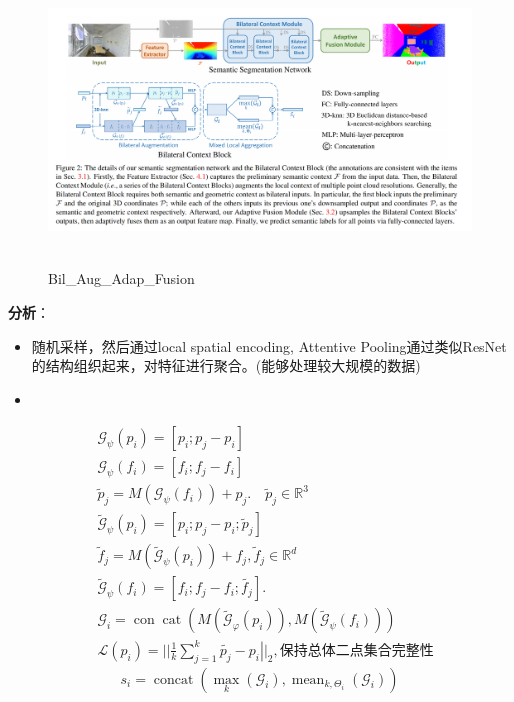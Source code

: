 \documentclass[a4paper,12pt]{article}
\begin{document}
	\begin{figure}[H]
	\begin{center}
		\includegraphics[width=1\textwidth]{img/Bil_Aug_Adap_Fusion.png} 
		\caption{Bil\_Aug\_Adap\_Fusion}
	\end{center}
\end{figure}


\textbf{分析}：
\begin{itemize}
	\item 随机采样，然后通过local spatial encoding, Attentive Pooling通过类似ResNet的结构组织起来，对特征进行聚合。(能够处理较大规模的数据)
	\item 
\end{itemize}
$$
\begin{aligned}
	&\mathcal{G}_{\psi}\left(p_{i}\right)=\left[p_{i} ; p_{j}-p_{i}\right]\\
	&\mathcal{G}_\psi\left(f_{i}\right)=\left[f_{i} ; f_{j}-f_{i}\right]\\
	&\tilde{p}_{j}=M\left(\mathcal{G}_\psi\left(f_{i}\right)\right)+p_{j} . \quad \tilde{p}_{j} \in \mathbb{R}^{3}\\
	&\tilde{\mathcal{G}}_{\psi}\left(p_{i}\right)=\left[p_{i} ; p_{j}-p_{i} ; \tilde{p}_{j}\right]\\
	&\tilde{f}_{j}=M\left(\tilde{\mathcal{G}}_{\psi}\left(p_{i}\right)\right)+f_{j}, \tilde{f}_{j} \in \mathbb{R}^{d}\\
	&\tilde{\mathcal{G}}_{\psi}\left(f_{i}\right)=\left[f_{i} ; f_{j}- f_{i} ; \tilde{f_{j}}\right] .\\
	&\mathcal{G}_{i}=\operatorname{con} \operatorname{cat}\left(M\left(\tilde{\mathcal{G}}_{\varphi}\left(p_{i}\right)\right), M\left(\tilde{\mathcal{G}}_{\psi}\left(f_{i}\right)\right)\right)\\
	&\mathcal{L}\left(p_{i}\right)=|| \frac{1}{k} \sum_{j=1}^{k} \tilde{p_{j}}-\left.p_{i}\right||_{2},保持总体二点集合完整性
\end{aligned}
$$
$$s_{i}=\operatorname{concat}\left(\max _{k}\left(\mathcal{G}_{i}\right), \operatorname{mean}_{k, \Theta_{i}}\left(\mathcal{G}_{i}\right)\right)$$
\end{document}
